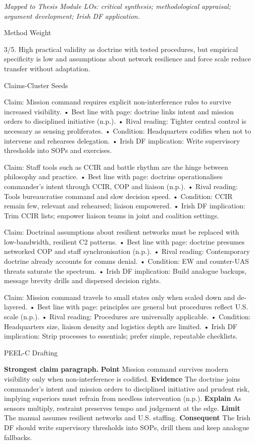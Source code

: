 \textit{Mapped to Thesis Module LOs: critical synthesis; methodological appraisal; argument development; Irish DF application.}

Method Weight

3/5. High practical validity as doctrine with tested procedures, but empirical specificity is low and assumptions about network resilience and force scale reduce transfer without adaptation.

Claims-Cluster Seeds

Claim: Mission command requires explicit non-interference rules to survive increased visibility.
• Best line with page: doctrine links intent and mission orders to disciplined initiative (n.p.).
• Rival reading: Tighter central control is necessary as sensing proliferates.
• Condition: Headquarters codifies when not to intervene and rehearses delegation.
• Irish DF implication: Write supervisory thresholds into SOPs and exercises.

Claim: Staff tools such as CCIR and battle rhythm are the hinge between philosophy and practice.
• Best line with page: doctrine operationalises commander’s intent through CCIR, COP and liaison (n.p.).
• Rival reading: Tools bureaucratise command and slow decision speed.
• Condition: CCIR remain few, relevant and rehearsed; liaison empowered.
• Irish DF implication: Trim CCIR lists; empower liaison teams in joint and coalition settings.

Claim: Doctrinal assumptions about resilient networks must be replaced with low-bandwidth, resilient C2 patterns.
• Best line with page: doctrine presumes networked COP and staff synchronisation (n.p.).
• Rival reading: Contemporary doctrine already accounts for comms denial.
• Condition: EW and counter-UAS threats saturate the spectrum.
• Irish DF implication: Build analogue backups, message brevity drills and dispersed decision rights.

Claim: Mission command travels to small states only when scaled down and de-layered.
• Best line with page: principles are general but procedures reflect U.S. scale (n.p.).
• Rival reading: Procedures are universally applicable.
• Condition: Headquarters size, liaison density and logistics depth are limited.
• Irish DF implication: Strip processes to essentials; prefer simple, repeatable checklists.

PEEL-C Drafting

\textbf{Strongest claim paragraph.}
\textbf{Point} Mission command survives modern visibility only when non-interference is codified.
\textbf{Evidence} The doctrine joins commander’s intent and mission orders to disciplined initiative and prudent risk, implying superiors must refrain from needless intervention (n.p.).
\textbf{Explain} As sensors multiply, restraint preserves tempo and judgement at the edge.
\textbf{Limit} The manual assumes resilient networks and U.S. staffing. \textbf{Consequent} The Irish DF should write supervisory thresholds into SOPs, drill them and keep analogue fallbacks.


